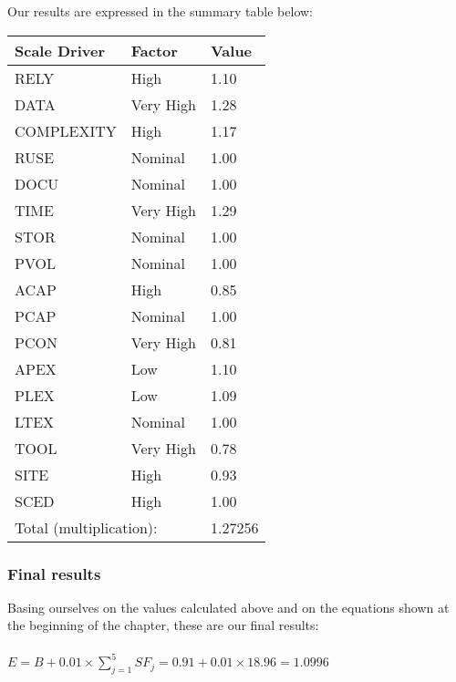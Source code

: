 		
\vspace{2cm}


Our results are expressed in the summary table below: 


	\begin{center}
		\begin{tabular}{|l|l|l|}
			\hline
			\textbf{Scale Driver} & \textbf{Factor} & \textbf{Value}\\ \hline
		
			RELY & High & 1.10\\
			DATA & Very High & 1.28\\
			COMPLEXITY & High & 1.17\\
			RUSE & Nominal & 1.00\\
			DOCU & Nominal & 1.00\\ \hline
			
			TIME & Very High & 1.29\\
			STOR & Nominal & 1.00\\
			PVOL & Nominal & 1.00\\ \hline
			
			ACAP & High & 0.85\\
			PCAP & Nominal & 1.00\\
			PCON & Very High & 0.81\\
			APEX & Low & 1.10\\
			PLEX & Low & 1.09\\
			LTEX & Nominal & 1.00\\ \hline
			
			TOOL & Very High & 0.78\\
			SITE & High & 0.93\\
			SCED & High & 1.00\\ \hline	
			
			\multicolumn{2}{|l|}{Total (multiplication):} & 1.27256\\ \hline
		\end{tabular}
	\end{center}
	
	
	\subsubsection{Final results}
	
	Basing ourselves on the values calculated above and on the equations shown at the beginning of the chapter, these are our final results: \\
	
	\paragraph{}\(E = B + 0.01 \times \sum_{j=1}^{5}SF_j = 0.91 + 0.01 \times 18.96 = 1.0996\)\\
	
